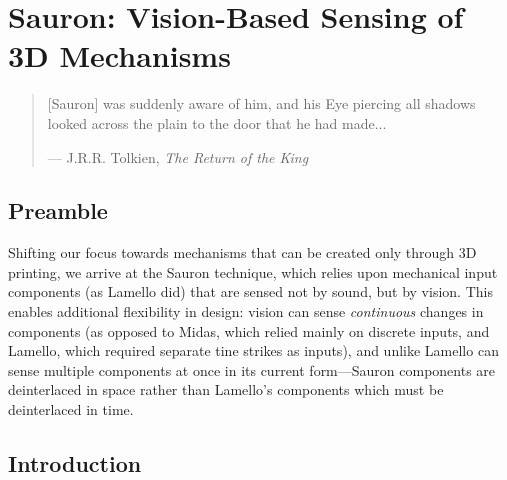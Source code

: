 \chapter{Sauron: Vision-Based Sensing of 3D Mechanisms}

\begin{quote}
[Sauron] was suddenly aware of him, and his Eye piercing all shadows looked across the plain to the door that he had made...

--- J.R.R. Tolkien, \emph{The Return of the King}
\end{quote}

\section{Preamble}

Shifting our focus towards mechanisms that can be created only through 3D printing, we arrive at the Sauron technique, which relies upon mechanical input components (as Lamello did) that are sensed not by sound, but by vision. This enables additional flexibility in design: vision can sense \emph{continuous} changes in components (as opposed to Midas, which relied mainly on discrete inputs, and Lamello, which required separate tine strikes as inputs), and unlike Lamello can sense multiple components at once in its current form---Sauron components are deinterlaced in space rather than Lamello's components which must be deinterlaced in time.


\section{Introduction}

